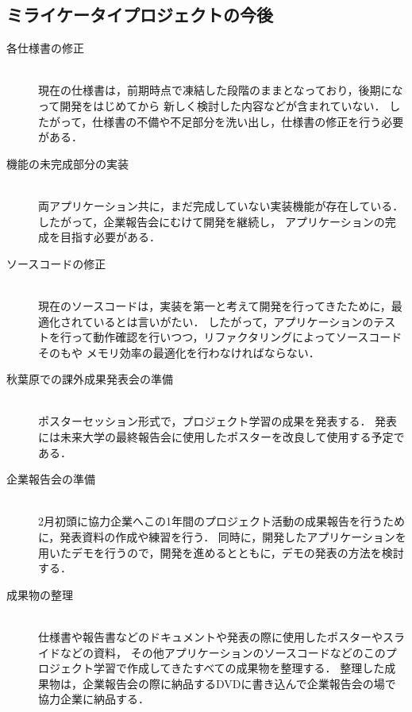 \subsection{ミライケータイプロジェクトの今後}

\begin{description}

\item[各仕様書の修正]\mbox{}\\ 
現在の仕様書は，前期時点で凍結した段階のままとなっており，後期になって開発をはじめてから
新しく検討した内容などが含まれていない．
したがって，仕様書の不備や不足部分を洗い出し，仕様書の修正を行う必要がある．

\item[機能の未完成部分の実装]\mbox{}\\ 
両アプリケーション共に，まだ完成していない実装機能が存在している．したがって，企業報告会にむけて開発を継続し，
アプリケーションの完成を目指す必要がある．

\item[ソースコードの修正]\mbox{}\\ 
現在のソースコードは，実装を第一と考えて開発を行ってきたために，最適化されているとは言いがたい．
したがって，アプリケーションのテストを行って動作確認を行いつつ，リファクタリングによってソースコードそのもや
メモリ効率の最適化を行わなければならない．

\item[秋葉原での課外成果発表会の準備]\mbox{}\\ 
ポスターセッション形式で，プロジェクト学習の成果を発表する．
発表には未来大学の最終報告会に使用したポスターを改良して使用する予定である．

\item[企業報告会の準備]\mbox{}\\ 
2月初頭に協力企業へこの1年間のプロジェクト活動の成果報告を行うために，発表資料の作成や練習を行う．
同時に，開発したアプリケーションを用いたデモを行うので，開発を進めるとともに，デモの発表の方法を検討する．

\item[成果物の整理]\mbox{}\\ 
仕様書や報告書などのドキュメントや発表の際に使用したポスターやスライドなどの資料，
その他アプリケーションのソースコードなどのこのプロジェクト学習で作成してきたすべての成果物を整理する．
整理した成果物は，企業報告会の際に納品するDVDに書き込んで企業報告会の場で協力企業に納品する．
\end{description}

